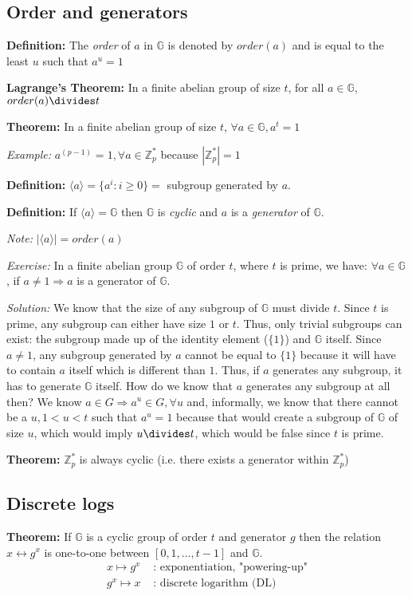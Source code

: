 \documentclass[11pt]{article}
\newcommand{\Zp}{\mathbb{Z}^{\ast}_p}
\newcommand{\G}{\mathbb{G}}
\newcommand{\gen}[1]{\langle #1 \rangle}
\newcommand{\definition}{\textbf{Definition:} }
\newcommand{\theoremof}[1]{\textbf{#1 Theorem:} }
\newcommand{\theorem}{\textbf{Theorem:} }
\newcommand{\note}{\emph{Note:} }
\newcommand{\example}{\emph{Example:} }
\begin{document}
\subsection{Order and generators}

\definition The \emph{order} of $a$ in $\G$ is denoted by $order(a)$ and is equal
to the least $u$ such that $a^u = 1$

\theoremof{Lagrange's} In a finite abelian group of size $t$, for all $a \in \G$,
$order(a) \divides t$

\theorem In a finite abelian group of size $t$, $\forall a \in \G, a^t = 1$

\example $a^{(p-1)} = 1, \forall a \in \Zp$ because $|\Zp| = 1$

\definition $\gen{a} = \{a^i : i \ge 0\} = $ subgroup generated by $a$.

\definition If $\gen{a} = \G$ then $\G$ is \emph{cyclic} and $a$ is a
\emph{generator} of $\G$.

\note $|\gen{a}| = order(a)$

\emph{Exercise:} In a finite abelian group $\G$ of order $t$, where $t$ is
prime, we have: $\forall a \in \G$, if $a \ne 1 \Rightarrow a$ is a generator of $\G$.

\emph{Solution:} We know that the size of any subgroup of $\G$ must divide $t$.
Since $t$ is prime, any subgroup can either have size $1$ or $t$. Thus, only
trivial subgroups can exist: the subgroup made up of the identity element
($\{1\}$) and $\G$ itself. Since $a \ne 1$, any subgroup generated by $a$ cannot
be equal to $\{1\}$ because it will have to contain $a$ itself which is
different than $1$.  Thus, if $a$ generates any subgroup, it has to generate
$\G$ itself. How do we know that $a$ generates any subgroup at all then? We know
$a \in G \Rightarrow a^u \in G, \forall u$ and, informally, we know that there
cannot be a $u, 1 < u < t$ such that $a^u = 1$ because that would create a
subgroup of $\G$ of size $u$, which would imply $u \divides t$, which would be
false since $t$ is prime.

\theorem $\Zp$ is always cyclic (i.e. there exists a generator within $\Zp$)

\subsection{Discrete logs}

\theorem If $\G$ is a cyclic group of order $t$ and generator $g$ then the relation
$x \leftrightarrow g^x$ is one-to-one between $[0, 1, \dots, t-1]$ and $\G$.
\begin{align*}
x \mapsto g^x & \text{ : exponentiation, "powering-up"}\\
g^x \mapsto x & \text{ : discrete logarithm (DL)}
\end{align*}
\end{document}
